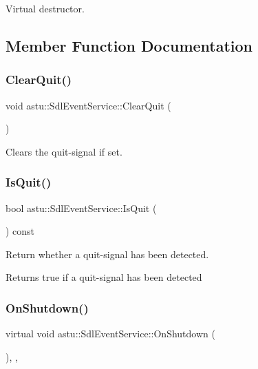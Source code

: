 Virtual destructor. 

\subsection{Member Function Documentation}
\mbox{\label{classastu_1_1SdlEventService_afe744162d9089344bfc32f6d65111ff6}} 
\subsubsection{\texorpdfstring{Clear\+Quit()}{ClearQuit()}}
{\footnotesize\ttfamily void astu\+::\+Sdl\+Event\+Service\+::\+Clear\+Quit (\begin{DoxyParamCaption}{ }\end{DoxyParamCaption})}

Clears the quit-\/signal if set. \mbox{\label{classastu_1_1SdlEventService_ac7b0eaae46bff34cc0d305a3dc3cea68}} 
\subsubsection{\texorpdfstring{Is\+Quit()}{IsQuit()}}
{\footnotesize\ttfamily bool astu\+::\+Sdl\+Event\+Service\+::\+Is\+Quit (\begin{DoxyParamCaption}{ }\end{DoxyParamCaption}) const}

Return whether a quit-\/signal has been detected.

\begin{DoxyReturn}{Returns}
{\ttfamily true} if a quit-\/signal has been detected 
\end{DoxyReturn}
\mbox{\label{classastu_1_1SdlEventService_a0163bd191605b5068d93cd6c8f26da0c}} 
\subsubsection{\texorpdfstring{On\+Shutdown()}{OnShutdown()}}
{\footnotesize\ttfamily virtual void astu\+::\+Sdl\+Event\+Service\+::\+On\+Shutdown (\begin{DoxyParamCaption}{ }\end{DoxyParamCaption})\hspace{0.3cm}{\ttfamily [override]}, {\ttfamily [protected]}, {\ttfamily [virtual]}}

